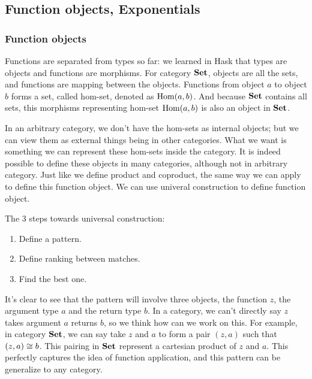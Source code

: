 
\setcounter{section}{8}
\setcounter{subsection}{0}
\subsection{Function objects, Exponentials}

\subsubsection{Function objects}

Functions are separated from types so far: we learned in Hask that types are
objects and functions are morphisms. For category $\mathbf{Set}$, objects are all the
sets, and functions are mapping between the objects. Functions from object $a$
to object $b$ forms a set, called hom-set, denoted as $\operatorname{Hom}(a,b)$. And because
$\mathbf{Set}$ contains all sets, this morphisms representing hom-set $\operatorname{Hom}(a,b)$ is also
an object in $\mathbf{Set}$.

In an arbitrary category, we don't have the hom-sets as internal objects; but we
can view them as external things being in other categories. What we want is
something we can represent these hom-sets inside the category. It is indeed
possible to define these objects in many categories, although not in arbitrary
category. Just like we define product and coproduct, the same way we can apply
to define this function object. We can use univeral construction to define
function object.

\begin{remark} The 3 steps towards universal construction:
\begin{enumerate}
\item Define a pattern.
\item Define ranking between matches.
\item Find the best one.
\end{enumerate}
\end{remark}

It's clear to see that the pattern will involve three objects, the function $z$,
the argument type $a$ and the return type $b$. In a category, we can't directly
say $z$ takes argument $a$ returns $b$, so we think how can we work on this. For
example, in category $\mathbf{Set}$, we can say take $z$ and $a$ to form a pair $(z,a)$
such that $(z,a) \iso b$. This pairing in $\mathbf{Set}$ represent a cartesian product
of $z$ and $a$. This perfectly captures the idea of function application, and
this pattern can be generalize to any category.

